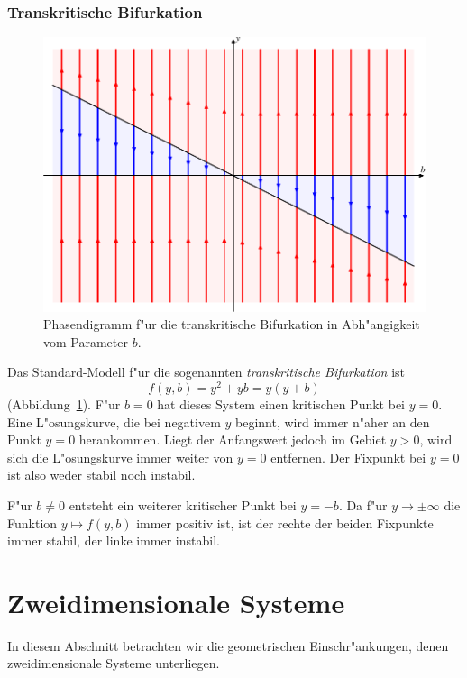 \subsubsection{Transkritische Bifurkation}
\begin{figure}
\centering
\includegraphics[width=\hsize]{chapters/images/bifurkation-3.pdf}
\caption{Phasendigramm f"ur die transkritische Bifurkation in Abh"angigkeit
vom Parameter $b$.
\label{geometrie:transkritisch}}
\end{figure}
Das Standard-Modell f"ur die sogenannten {\em transkritische Bifurkation} ist 
\[
f(y,b)=y^2+yb = y(y+b)
\]
(Abbildung~\ref{geometrie:transkritisch}).
F"ur $b=0$ hat dieses System einen kritischen Punkt bei $y=0$.
Eine L"osungskurve, die bei negativem $y$ beginnt, wird immer n"aher
an den Punkt $y=0$ herankommen.
Liegt der Anfangswert jedoch im Gebiet $y>0$, wird sich die L"osungskurve
immer weiter von $y=0$ entfernen.
Der Fixpunkt bei $y=0$ ist also weder stabil noch instabil.

F"ur $b\ne 0$ entsteht ein weiterer kritischer Punkt bei $y=-b$.
Da f"ur $y\to\pm\infty$ die Funktion $y\mapsto f(y,b)$ immer positiv
ist, ist der rechte der beiden Fixpunkte immer stabil, der
linke immer instabil.


%
%
\section{Zweidimensionale Systeme}
In diesem Abschnitt betrachten wir die geometrischen Einschr"ankungen, denen
zweidimensionale Systeme unterliegen.


